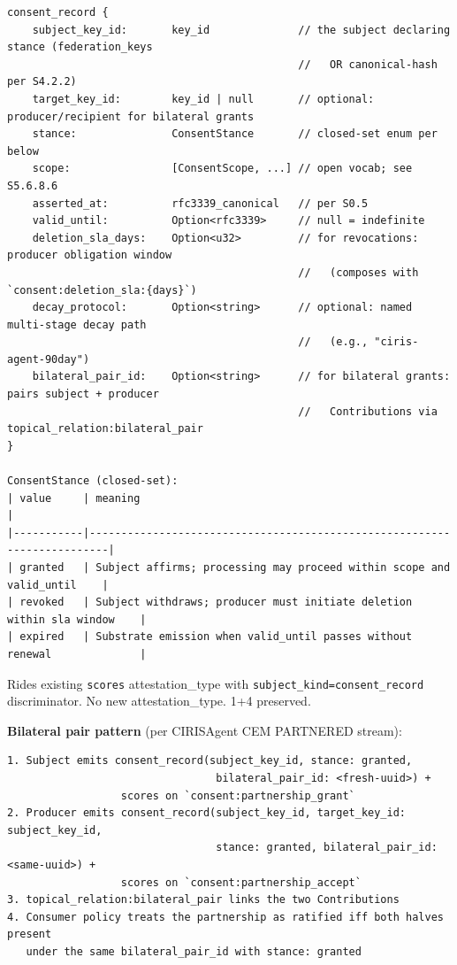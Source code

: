 \documentclass[10pt]{article}
\begin{document}
\begin{lstlisting}
consent_record {
    subject_key_id:       key_id              // the subject declaring stance (federation_keys
                                              //   OR canonical-hash per S4.2.2)
    target_key_id:        key_id | null       // optional: producer/recipient for bilateral grants
    stance:               ConsentStance       // closed-set enum per below
    scope:                [ConsentScope, ...] // open vocab; see S5.6.8.6
    asserted_at:          rfc3339_canonical   // per S0.5
    valid_until:          Option<rfc3339>     // null = indefinite
    deletion_sla_days:    Option<u32>         // for revocations: producer obligation window
                                              //   (composes with `consent:deletion_sla:{days}`)
    decay_protocol:       Option<string>      // optional: named multi-stage decay path
                                              //   (e.g., "ciris-agent-90day")
    bilateral_pair_id:    Option<string>      // for bilateral grants: pairs subject + producer
                                              //   Contributions via topical_relation:bilateral_pair
}

ConsentStance (closed-set):
| value     | meaning                                                                 |
|-----------|-------------------------------------------------------------------------|
| granted   | Subject affirms; processing may proceed within scope and valid_until    |
| revoked   | Subject withdraws; producer must initiate deletion within sla window    |
| expired   | Substrate emission when valid_until passes without renewal              |
\end{lstlisting}

Rides existing \texttt{scores} attestation\_type with \texttt{subject\_kind=consent\_record} discriminator. No new attestation\_type. 1+4 preserved.


\textbf{Bilateral pair pattern} (per CIRISAgent CEM PARTNERED stream):


\begin{lstlisting}
1. Subject emits consent_record(subject_key_id, stance: granted,
                                 bilateral_pair_id: <fresh-uuid>) +
                  scores on `consent:partnership_grant`
2. Producer emits consent_record(subject_key_id, target_key_id: subject_key_id,
                                 stance: granted, bilateral_pair_id: <same-uuid>) +
                  scores on `consent:partnership_accept`
3. topical_relation:bilateral_pair links the two Contributions
4. Consumer policy treats the partnership as ratified iff both halves present
   under the same bilateral_pair_id with stance: granted
\end{lstlisting}
\end{document}
